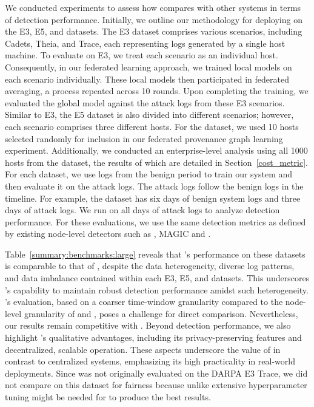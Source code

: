 
We conducted experiments to assess how \Sys compares with other systems in terms of detection performance. Initially, we outline our methodology for deploying \Sys on the \darpa E3, E5, and \optc datasets. The E3 dataset comprises various scenarios, including Cadets, Theia, and Trace, each representing logs generated by a single host machine. To evaluate \Sys on E3, we treat each scenario as an individual host. Consequently, in our federated learning approach, we trained local \gnnshort models on each scenario individually. These local models then participated in federated averaging, a process repeated across 10 rounds. Upon completing the training, we evaluated the global \gnnshort model against the attack logs from these E3 scenarios. Similar to E3, the E5 dataset is also divided into different scenarios; however, each scenario comprises three different hosts. For the \optc dataset, we used 10 hosts selected randomly for inclusion in our federated provenance graph learning experiment. Additionally, we conducted an enterprise-level analysis using all 1000 hosts from the \optc dataset, the results of which are detailed in Section~\ref{cost_metric}. For each dataset, we use logs from the benign period to train our system and then evaluate it on the attack logs. The attack logs follow the benign logs in the timeline. For example, the \optc dataset has six days of benign system logs and three days of attack logs. We run \Sys on all days of attack logs to analyze detection performance. For these evaluations, we use the same detection metrics as defined by existing node-level detectors such as \threatrace, MAGIC and \flash.

Table~\ref{summary:benchmarks:large} reveals that \Sys's performance on these datasets is comparable to that of \flash, despite the data heterogeneity, diverse log patterns, and data imbalance contained within each E3, E5, and \optc datasets. This underscores \Sys's capability to maintain robust detection performance amidst such heterogeneity. \kairos's evaluation, based on a coarser time-window granularity compared to the node-level granularity of \flash and \Sys, poses a challenge for direct comparison. Nevertheless, our results remain competitive with \kairos. Beyond detection performance, we also highlight \Sys's qualitative advantages, including its privacy-preserving features and decentralized, scalable operation. These aspects underscore the value of \Sys in contrast to centralized systems, emphasizing its high practicality in real-world deployments. Since \kairos was not originally evaluated on the DARPA E3 Trace, we did not compare \kairos on this dataset for fairness because unlike \flash extensive hyperparameter tuning might be needed for \kairos to produce the best results.

